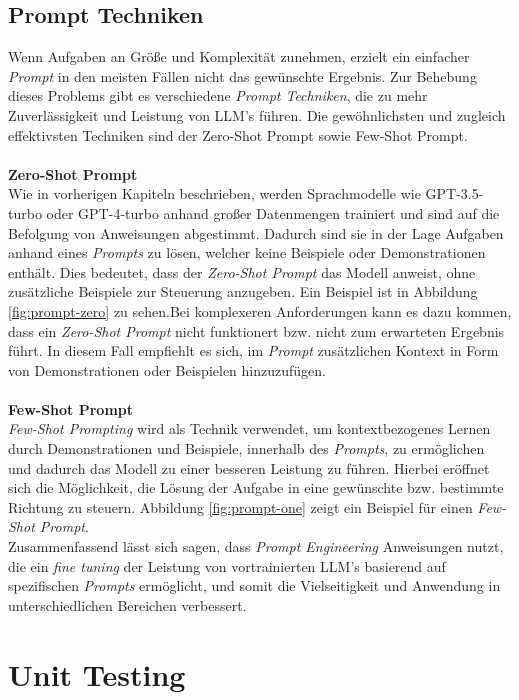 \subsection{Prompt Techniken}
Wenn Aufgaben an Größe und Komplexität zunehmen, erzielt ein einfacher \textit{Prompt} in den meisten Fällen nicht das gewünschte Ergebnis. Zur Behebung dieses Problems gibt es verschiedene \textit{Prompt Techniken}, die zu mehr Zuverlässigkeit und Leistung von LLM's führen. Die gewöhnlichsten und zugleich effektivsten Techniken sind der Zero-Shot Prompt sowie Few-Shot Prompt. \cite*{PromptEngineeringGuide}\\\\
\textbf{Zero-Shot Prompt}\\[0.2cm]
Wie in vorherigen Kapiteln beschrieben, werden Sprachmodelle wie GPT-3.5-turbo oder GPT-4-turbo anhand großer Datenmengen trainiert und sind auf die Befolgung von Anweisungen abgestimmt. Dadurch sind sie in der Lage Aufgaben anhand eines \textit{Prompts} zu lösen, welcher keine Beispiele oder Demonstrationen enthält. Dies bedeutet, dass der \textit{Zero-Shot Prompt} das Modell anweist, ohne zusätzliche Beispiele zur Steuerung anzugeben. Ein Beispiel ist in Abbildung \ref{fig:prompt-zero} zu sehen.Bei komplexeren Anforderungen kann es dazu kommen, dass ein \textit{Zero-Shot Prompt} nicht funktionert bzw. nicht zum erwarteten Ergebnis führt. In diesem Fall empfiehlt es sich, im \textit{Prompt} zusätzlichen Kontext in Form von Demonstrationen oder Beispielen hinzuzufügen. \cite{PromptEngineeringGuide}\\\\
\textbf{Few-Shot Prompt}\\[0.2cm]
\textit{Few-Shot Prompting} wird als Technik verwendet, um kontextbezogenes Lernen durch Demonstrationen und Beispiele, innerhalb des \textit{Prompts}, zu ermöglichen und dadurch das Modell zu einer besseren Leistung zu führen. Hierbei eröffnet sich die Möglichkeit, die Lösung der Aufgabe in eine gewünschte bzw. bestimmte Richtung zu steuern. Abbildung \ref{fig:prompt-one} zeigt ein Beispiel für einen \textit{Few-Shot Prompt}. \\
Zusammenfassend lässt sich sagen, dass \textit{Prompt Engineering} Anweisungen nutzt, die ein \textit{fine tuning} der Leistung von vortrainierten LLM's basierend auf spezifischen \textit{Prompts} ermöglicht, und somit die Vielseitigkeit und Anwendung in unterschiedlichen Bereichen verbessert. \cite*{sahooSystematicSurveyPrompt2024}

\section{Unit Testing}


